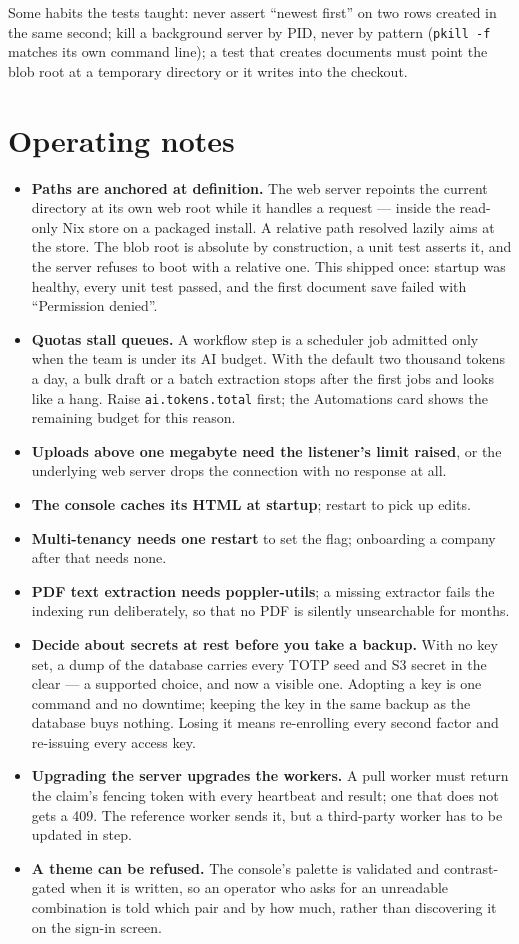 \documentclass[11pt,a4paper]{report}
\gdef\currentchapterart{art/telemachus-head.png}
\newcommand{\chapterart}[1]{\gdef\currentchapterart{#1}}
\newcommand{\chapterart}[1]{}
\begin{document}
Some habits the tests taught: never assert ``newest first'' on two rows created in the same second; kill a background server by PID, never by pattern (\texttt{pkill -f} matches its own command line); a test that creates documents must point the blob root at a temporary directory or it writes into the checkout.

\chapterart{art/ch-17-operating.png}
\chapter{Operating notes}

\begin{itemize}
\item \textbf{Paths are anchored at definition.} The web server repoints the current directory at its own web root while it handles a request --- inside the read-only Nix store on a packaged install. A relative path resolved lazily aims at the store. The blob root is absolute by construction, a unit test asserts it, and the server refuses to boot with a relative one. This shipped once: startup was healthy, every unit test passed, and the first document save failed with ``Permission denied''.
\item \textbf{Quotas stall queues.} A workflow step is a scheduler job admitted only when the team is under its AI budget. With the default two thousand tokens a day, a bulk draft or a batch extraction stops after the first jobs and looks like a hang. Raise \texttt{ai.tokens.total} first; the Automations card shows the remaining budget for this reason.
\item \textbf{Uploads above one megabyte need the listener's limit raised}, or the underlying web server drops the connection with no response at all.
\item \textbf{The console caches its HTML at startup}; restart to pick up edits.
\item \textbf{Multi-tenancy needs one restart} to set the flag; onboarding a company after that needs none.
\item \textbf{PDF text extraction needs poppler-utils}; a missing extractor fails the indexing run deliberately, so that no PDF is silently unsearchable for months.
\item \textbf{Decide about secrets at rest before you take a backup.} With no key set, a dump of the database carries every TOTP seed and S3 secret in the clear --- a supported choice, and now a visible one. Adopting a key is one command and no downtime; keeping the key in the same backup as the database buys nothing. Losing it means re-enrolling every second factor and re-issuing every access key.
\item \textbf{Upgrading the server upgrades the workers.} A pull worker must return the claim's fencing token with every heartbeat and result; one that does not gets a 409. The reference worker sends it, but a third-party worker has to be updated in step.
\item \textbf{A theme can be refused.} The console's palette is validated and contrast-gated when it is written, so an operator who asks for an unreadable combination is told which pair and by how much, rather than discovering it on the sign-in screen.
\end{itemize}
\end{document}
